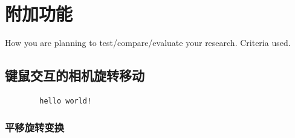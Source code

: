 

    \chapter{附加功能}

    How you are planning to test/compare/evaluate your research.
    Criteria used.
	
	\section{键鼠交互的相机旋转移动}
	\begin{lstlisting}
		hello world!
	\end{lstlisting}
	\subsection{平移旋转变换}
